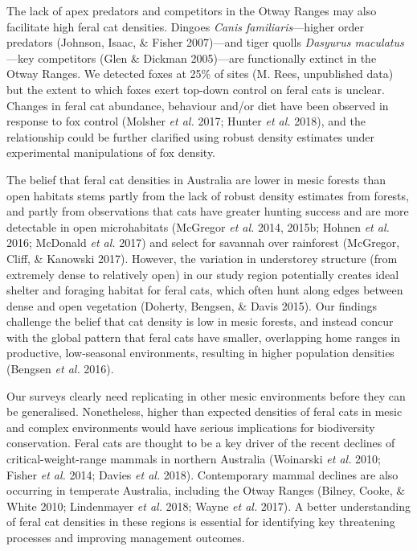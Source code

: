 \documentclass[11pt,a4paper,titlepage,twoside,openright]{style/unimelbthesis}
\begin{document}
\begin{mainmatter}
The lack of apex predators and competitors in the Otway Ranges may also facilitate high feral cat densities. Dingoes \emph{Canis familiaris}---higher order predators (Johnson, Isaac, \& Fisher 2007)---and tiger quolls \emph{Dasyurus maculatus}---key competitors (Glen \& Dickman 2005)---are functionally extinct in the Otway Ranges. We detected foxes at 25\% of sites (M. Rees, unpublished data) but the extent to which foxes exert top-down control on feral cats is unclear. Changes in feral cat abundance, behaviour and/or diet have been observed in response to fox control (Molsher \emph{et al.} 2017; Hunter \emph{et al.} 2018), and the relationship could be further clarified using robust density estimates under experimental manipulations of fox density.

The belief that feral cat densities in Australia are lower in mesic forests than open habitats stems partly from the lack of robust density estimates from forests, and partly from observations that cats have greater hunting success and are more detectable in open microhabitats (McGregor \emph{et al.} 2014, 2015b; Hohnen \emph{et al.} 2016; McDonald \emph{et al.} 2017) and select for savannah over rainforest (McGregor, Cliff, \& Kanowski 2017). However, the variation in understorey structure (from extremely dense to relatively open) in our study region potentially creates ideal shelter and foraging habitat for feral cats, which often hunt along edges between dense and open vegetation (Doherty, Bengsen, \& Davis 2015). Our findings challenge the belief that cat density is low in mesic forests, and instead concur with the global pattern that feral cats have smaller, overlapping home ranges in productive, low-seasonal environments, resulting in higher population densities (Bengsen \emph{et al.} 2016).

Our surveys clearly need replicating in other mesic environments before they can be generalised. Nonetheless, higher than expected densities of feral cats in mesic and complex environments would have serious implications for biodiversity conservation. Feral cats are thought to be a key driver of the recent declines of critical-weight-range mammals in northern Australia (Woinarski \emph{et al.} 2010; Fisher \emph{et al.} 2014; Davies \emph{et al.} 2018). Contemporary mammal declines are also occurring in temperate Australia, including the Otway Ranges (Bilney, Cooke, \& White 2010; Lindenmayer \emph{et al.} 2018; Wayne \emph{et al.} 2017). A better understanding of feral cat densities in these regions is essential for identifying key threatening processes and improving management outcomes.


\end{mainmatter}
\end{document}
